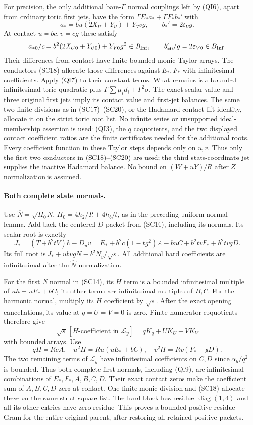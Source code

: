 For precision, the only additional bare-$\Gamma$ normal couplings
left by (QI6), apart from ordinary toric first jets, have the form
$\Gamma E_*a_*+\Gamma F_*b_*'$ with
\[
 a_*=bu(2X_U+Y_U)+Y_Vvg,
 \qquad b_*'=2\varepsilon_Vg.
\]
At contact $u=bc,v=cg$ these satisfy
\[
 a_{*0}/c=b^2(2X_{U0}+Y_{U0})+Y_{V0}g^2\in B_{\rm Inf},
 \qquad b_{*0}'/g=2\varepsilon_{V0}\in B_{\rm Inf}.
\]
Their differences from contact have finite bounded monic Taylor
arrays. The conductors (SC18) allocate those differences against
$E_*,F_*$ with infinitesimal coefficients. Apply (QI7) to their
constant terms. What remains is a bounded infinitesimal toric
quadratic plus $\Gamma\sum\mu_i d_i+\Gamma^2\sigma$.
The exact scalar value and three original first jets imply its
contact value and first-jet balances. The same two finite divisions
as in (SC17)--(SC20), or the Hadamard contact-lift identity, allocate
it on the strict toric root list. No infinite series or unsupported
ideal-membership assertion is used: (QI3), the $q$ coquotients,
and the two displayed contact coefficient ratios are the finite
certificates needed for the additional roots.
Every coefficient function in these Taylor steps depends only on
$u,v$. Thus only the first two conductors in (SC18)--(SC20) are
used; the third state-coordinate jet supplies the inactive Hadamard
balance. No bound on $(W+uY)/R$ after $Z$ normalization is assumed.

\paragraph{Both complete state normals.}
Use $\widehat N=\sqrt{H_0}N$, $H_0=4h_2/R+4h_b/t$, as in the
preceding uniform-normal lemma. Add back the centered $D$ packet
from (SC10), including its normals. Its scalar root is exactly
\[
 J_*=(T+b^2tV)h-D_uv
 =E_*+b^2c(1-tg^2)A-buC+b^2tvF_*+b^2tvgD.
 \tag{QI9}
\]
Its full root is $J_*+ubvgN-b^2N_y/\sqrt s$.
All additional hard coefficients are infinitesimal after the
$\widehat N$ normalization.

For the first $N$ normal in (SC14), its $H$ term is a bounded
infinitesimal multiple of $u h=uE_*+bC$; its other terms are
infinitesimal multiples of $B,C$. For the harmonic normal, multiply
its $H$ coefficient by $\sqrt s$. After the exact opening
cancellations, its value at $q=U=V=0$ is zero. Finite numerator
coquotients therefore give
\[
 \sqrt s\,[H\text{-coefficient in }\mathcal L_y]
       =qK_q+UK_U+VK_V
 \tag{QI10}
\]
with bounded arrays. Use
\[
 qH=RcA,\quad u^2H=Ru(uE_*+bC),\quad
 v^2H=Rv(F_*+gD).
\]
The two remaining terms of $\mathcal L_y$ have infinitesimal
coefficients on $C,D$ since $\alpha_b/q^2$ is bounded. Thus both
complete first normals, including (QI9), are infinitesimal
combinations of $E_*,F_*,A,B,C,D$. Their exact contact zeros make
the coefficient sum of $A,B,C,D$ zero at contact. One finite monic
division and (SC18) allocate these on the same strict square list.
The hard block has residue $\operatorname{diag}(1,4)$ and all its
other entries have zero residue. This proves a bounded positive
residue Gram for the entire original parent, after restoring all
retained positive packets.

